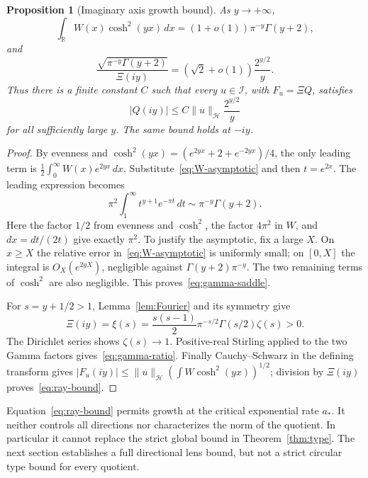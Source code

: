 \documentclass[11pt,a4paper]{article}
\numberwithin{equation}{section}
\newtheorem{proposition}[theorem]{Proposition}
\theoremstyle{definition}
\theoremstyle{remark}
\newcommand{\R}{\mathbb R}
\newcommand{\Hh}{\mathcal H}
\newcommand{\Ii}{\mathcal I}
\newcommand{\norm}[1]{\lVert #1\rVert}
\begin{document}
\begin{proposition}[Imaginary axis growth bound]\label{prop:ray}
As $y\to+\infty$,
\begin{equation}\label{eq:gamma-saddle}
 \int_\R W(x)\cosh^2(yx)\,dx
 =(1+o(1))\pi^{-y}\Gamma(y+2),
\end{equation}
and
\begin{equation}\label{eq:gamma-ratio}
 \frac{\sqrt{\pi^{-y}\Gamma(y+2)}}{\Xi(iy)}
 =(\sqrt2+o(1))\frac{2^{y/2}}{y}.
\end{equation}
Thus there is a finite constant $C$ such that every $u\in\Ii$, with $F_u=\Xi Q$, satisfies
\begin{equation}\label{eq:ray-bound}
 |Q(iy)|\le C\norm{u}_{\Hh}\frac{2^{y/2}}{y}
\end{equation}
for all sufficiently large $y$. The same bound holds at $-iy$.
\end{proposition}
\begin{proof}
By evenness and $\cosh^2(yx)=(e^{2yx}+2+e^{-2yx})/4$, the only leading term is
$\frac12\int_0^\infty W(x)e^{2yx}\,dx$. Substitute~\eqref{eq:W-asymptotic} and then $t=e^{2x}$. The leading expression becomes
\[
 \pi^2\int_1^\infty t^{y+1}e^{-\pi t}\,dt
 \sim\pi^{-y}\Gamma(y+2).
\]
Here the factor $1/2$ from evenness and $\cosh^2$, the factor $4\pi^2$ in $W$, and $dx=dt/(2t)$ give exactly $\pi^2$. To justify the asymptotic, fix a large $X$. On $x\ge X$ the relative error in~\eqref{eq:W-asymptotic} is uniformly small; on $[0,X]$ the integral is $O_X(e^{2yX})$, negligible against $\Gamma(y+2)\pi^{-y}$. The two remaining terms of $\cosh^2$ are also negligible. This proves~\eqref{eq:gamma-saddle}.

For $s=y+1/2>1$, Lemma~\ref{lem:Fourier} and its symmetry give
\[
 \Xi(iy)=\xi(s)=\frac{s(s-1)}2\pi^{-s/2}\Gamma(s/2)\zeta(s)>0.
\]
The Dirichlet series shows $\zeta(s)\to1$. Positive-real Stirling applied to the two Gamma factors gives~\eqref{eq:gamma-ratio}. Finally Cauchy--Schwarz in the defining transform gives
$|F_u(iy)|\le\norm{u}_{\Hh}(\int W\cosh^2(yx))^{1/2}$; division by $\Xi(iy)$ proves~\eqref{eq:ray-bound}.
\end{proof}

Equation~\eqref{eq:ray-bound} permits growth at the critical exponential rate $a_*$. It neither controls all directions nor characterizes the norm of the quotient. In particular it cannot replace the strict global bound in Theorem~\ref{thm:type}. The next section establishes a full directional lens bound, but not a strict circular type bound for every quotient.
\end{document}
